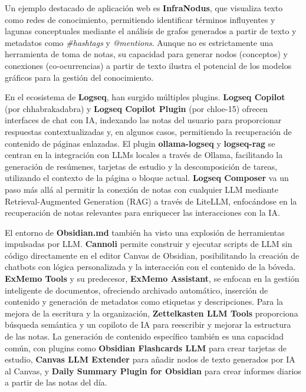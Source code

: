 Un ejemplo destacado de aplicación web es \textbf{InfraNodus}, que visualiza texto como redes de conocimiento, permitiendo identificar términos influyentes y lagunas conceptuales mediante el análisis de grafos generados a partir de texto y metadatos como \textit{\#hashtags} y \textit{@mentions}. Aunque no es estrictamente una herramienta de toma de notas, su capacidad para generar nodos (conceptos) y conexiones (co-ocurrencias) a partir de texto ilustra el potencial de los modelos gráficos para la gestión del conocimiento.

En el ecosistema de \textbf{Logseq}, han surgido múltiples plugins. \textbf{Logseq Copilot} (por chhabrakadabra) y \textbf{Logseq Copilot Plugin} (por chloe-15) ofrecen interfaces de chat con IA, indexando las notas del usuario para proporcionar respuestas contextualizadas y, en algunos casos, permitiendo la recuperación de contenido de páginas enlazadas. El plugin \textbf{ollama-logseq} y \textbf{logseq-rag} se centran en la integración con LLMs locales a través de Ollama, facilitando la generación de resúmenes, tarjetas de estudio y la descomposición de tareas, utilizando el contexto de la página o bloque actual. \textbf{Logseq Composer} va un paso más allá al permitir la conexión de notas con cualquier LLM mediante Retrieval-Augmented Generation (RAG) a través de LiteLLM, enfocándose en la recuperación de notas relevantes para enriquecer las interacciones con la IA.

El entorno de \textbf{Obsidian.md} también ha visto una explosión de herramientas impulsadas por LLM. \textbf{Cannoli} permite construir y ejecutar scripts de LLM sin código directamente en el editor Canvas de Obsidian, posibilitando la creación de chatbots con lógica personalizada y la interacción con el contenido de la bóveda. \textbf{ExMemo Tools} y su predecesor, \textbf{ExMemo Assistant}, se enfocan en la gestión inteligente de documentos, ofreciendo archivado automático, inserción de contenido y generación de metadatos como etiquetas y descripciones. Para la mejora de la escritura y la organización, \textbf{Zettelkasten LLM Tools} proporciona búsqueda semántica y un copiloto de IA para reescribir y mejorar la estructura de las notas. La generación de contenido específico también es una capacidad común, con plugins como \textbf{Obsidian Flashcards LLM} para crear tarjetas de estudio, \textbf{Canvas LLM Extender} para añadir nodos de texto generados por IA al Canvas, y \textbf{Daily Summary Plugin for Obsidian} para crear informes diarios a partir de las notas del día.

